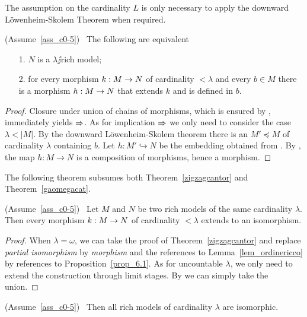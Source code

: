 \documentclass[creche.tex]{subfiles}
\begin{document}
The assumption on the cardinality $L$ is only necessary to apply the downward L\"owenheim-Skolem Theorem when required.

\begin{proposition}\label{prop_6.1}
(Assume~\ref{ass_c0-5})  \  The following are equivalent
\begin{itemize}
\item[1.] $N$ is a $\lambda\jj$rich model;
\item[2.]for every morphism $k:M\rightarrow N$ of cardinality $<\lambda$ and every $b\in M$ there is a morphism $h:M\rightarrow N$ that extends $k$ and is defined in $b$.
\end{itemize}
\end{proposition}
\begin{proof}
Closure under union of chains of morphisms, which is ensured by , immediately yields $\Rightarrow$. As for implication $\Rightarrow$ we only need to consider the case $\lambda<|M|$.  By the downward L\"owenheim-Skolem theorem there is an  $M'\preceq M$ of cardinality $\lambda$ containing $b$. Let $h:M'\hookrightarrow N$ be the embedding obtained from . By , the map  $h:M\to N$ is a composition of morphisms, hence a morphism.
\end{proof}

The following theorem subsumes both Theorem~\ref{zigzagcantor} and Theorem~\ref{gaomegacat}.

\begin{theorem}\label{thm_riccozigzag}
(Assume~\ref{ass_c0-5})  \  Let $M$ and $N$ be two rich models of the same cardinality $\lambda$. Then every morphism $k:M\rightarrow N$ of cardinality $<\lambda$ extends to an isomorphism.
\end{theorem}

\begin{proof}
When $\lambda=\omega$, we can take the proof of Theorem~\ref{zigzagcantor} and replace \textit{partial isomorphism\/} by \textit{morphism\/} and the references to Lemma~\ref{lem_ordinericco} by references to Proposition~\ref{prop_6.1}. As for uncountable $\lambda$, we only need to extend the construction through limit stages. By  we can simply take the union.
\end{proof}


\begin{corollary}\label{coroll_riccozigzag}
(Assume~\ref{ass_c0-5})  \  Then all rich models of cardinality $\lambda$ are isomorphic.\QED
\end{corollary}
\end{document}
